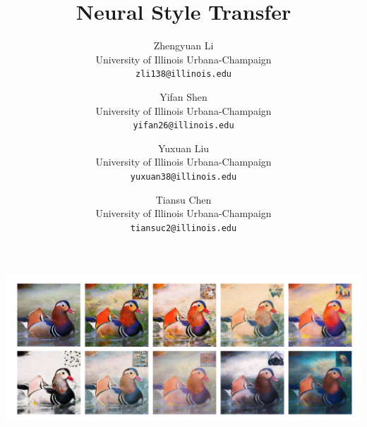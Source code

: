 \documentclass[10pt,twocolumn,letterpaper]{article}
\begin{document}
\title{Neural Style Transfer}

\author{Zhengyuan Li\\
University of Illinois Urbana-Champaign\\
{\tt\small zli138@illinois.edu}
\and
Yifan Shen\\
University of Illinois Urbana-Champaign\\
{\tt\small yifan26@illinois.edu}
\and
Yuxuan Liu\\
University of Illinois Urbana-Champaign\\
{\tt\small yuxuan38@illinois.edu}
\and
Tiansu Chen\\
University of Illinois Urbana-Champaign\\
{\tt\small tiansuc2@illinois.edu}
}


\maketitle
\begin{strip}
    \centering
    \includegraphics[width=15cm]{teaser.png}
    \label{fig:galaxy}
\end{strip}
\end{document}
